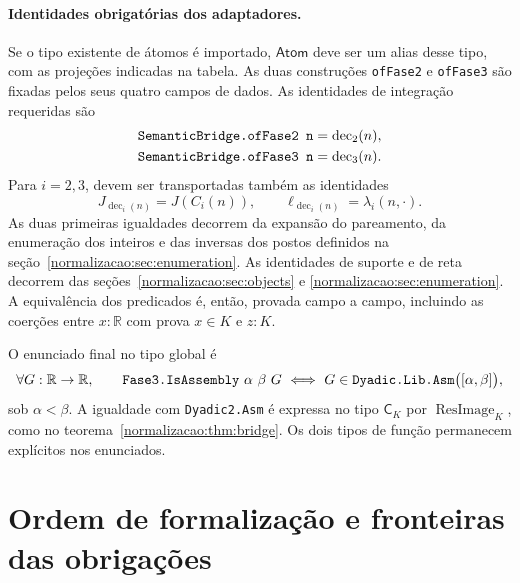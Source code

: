 \documentclass[12pt,a4paper]{article}
\theoremstyle{preciso}
\theoremstyle{definition}
\newcommand{\R}{\mathbb R}
\newcommand{\Atoms}{\mathsf{Atom}}
\newcommand{\CK}{\mathsf C_K}
\newcommand{\ImageRes}{\operatorname{ResImage}}
\newcommand{\dec}{\operatorname{dec}}
\newcommand{\code}[1]{\nolinkurl{#1}}
\theoremstyle{preciso}
\theoremstyle{preciso}
\theoremstyle{preciso}
\theoremstyle{preciso}
\theoremstyle{definition}
\theoremstyle{preciso}
\theoremstyle{definition}
\theoremstyle{preciso}
\theoremstyle{preciso}
\theoremstyle{definition}
\begin{document}
\paragraph{Identidades obrigatórias dos adaptadores.}
Se o tipo existente de átomos é importado, $\Atoms$ deve ser um
alias desse tipo, com as projeções indicadas na tabela.
As duas construções \code{ofFase2} e \code{ofFase3} são fixadas
pelos seus quatro campos de dados. As identidades de integração
requeridas são
\[
 \begin{aligned}
 \text{\ttfamily SemanticBridge.ofFase2 n}&=\dec_2(n),\\
 \text{\ttfamily SemanticBridge.ofFase3 n}&=\dec_3(n).
 \end{aligned}
\]
Para $i=2,3$, devem ser transportadas também as identidades
\[
 J_{\dec_i(n)}=J(C_i(n)),\qquad
 \ell_{\dec_i(n)}=\lambda_i(n,\cdot).
\]
As duas primeiras igualdades decorrem da expansão do pareamento, da
enumeração dos inteiros e das inversas dos postos definidos na
seção~\ref{normalizacao:sec:enumeration}. As identidades de suporte e de reta decorrem das
seções~\ref{normalizacao:sec:objects} e \ref{normalizacao:sec:enumeration}.
A equivalência dos predicados é, então, provada campo a campo,
incluindo as coerções entre $x:\R$ com prova $x\in K$ e $z:K$.

O enunciado final no tipo global é
\[
 \forall G:\R\to\R,\qquad
 \text{\ttfamily Fase3.IsAssembly}\ \alpha\ \beta\ G
 \ \Longleftrightarrow\
 G\in\text{\ttfamily Dyadic.Lib.Asm}\bigl([\alpha,\beta]\bigr),
\]
sob $\alpha<\beta$. A igualdade com \code{Dyadic2.Asm} é
expressa no tipo $\CK$ por $\ImageRes_K$, como no
teorema~\ref{normalizacao:thm:bridge}. Os dois tipos de função permanecem
explícitos nos enunciados.

\section{Ordem de formalização e fronteiras das obrigações}
\label{normalizacao:sec:dependencies}
\end{document}
